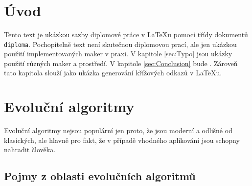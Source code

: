 \documentclass[bc,male,java,dept460]{diploma}		%
\begin{document}
\MakeTitlePages

\tableofcontents
\cleardoublepage	%

\listoftables
\cleardoublepage	%

\listoffigures
\cleardoublepage	%

\lstlistoflistings
\cleardoublepage	%

\section{Úvod}
\label{sec:Uvod}
\paragraph*{}
Tento text je ukázkou sazby diplomové práce v \LaTeX{}u pomocí třídy dokumentů \verb|diploma|.
Pochopitelně text není skutečnou diplomovou prací, ale jen ukázkou použití
implementovaných maker v praxi. V kapitole \ref{sec:Typo} jsou ukázky použití
různých maker a prostředí. V kapitole \ref{sec:Conclusion} bude . Zároveň tato kapitola slouží jako ukázka generování křížových odkazů v \LaTeX{}u.

\section{Evoluční algoritmy}
\paragraph*{}
Evoluční algoritmy nejsou populární jen proto, že jsou moderní a odlišné od klasických, ale hlavně pro fakt, že v případě vhodného aplikování jsou schopny nahradit člověka.

\subsection{Pojmy z oblasti evolučních algoritmů}
\end{document}
